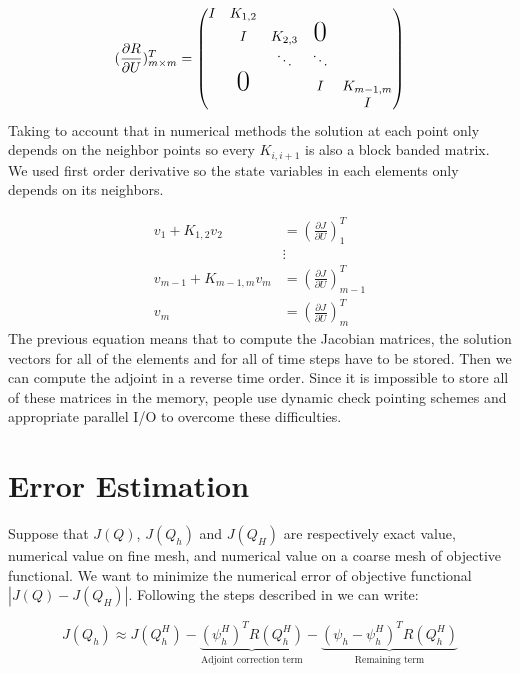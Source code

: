 \documentclass[a4paper,10pt]{article}
\begin{document}
\begin{equation}
   (\frac{\partial R}{\partial U})_{m \times m}^T =
   \begin{pmatrix}
  I & K_{1,2}        &         &               &          \\
    & I              & K_{2,3} & \text{\huge0} &          \\
    &                & \ddots  & \ddots        &          \\
    & \text{\huge0}  &         & I             & K_{m-1,m}\\
    &                &         &               & I
 \end{pmatrix}
  \end{equation}  
Taking to account that in numerical methods the solution at each point only depends on the neighbor points so every $K_{i,i+1}$
is also a block banded matrix. We used first order derivative so the state variables in each elements only depends on its neighbors.

\begin{equation}
  \begin{aligned}
 v_1 + K_{1,2} v_2 &=\left(\frac{\partial J}{\partial U}\right)_1^T \\
 &\vdots\\
 v_{m-1} + K_{m-1,m} v_m &=\left(\frac{\partial J}{\partial U}\right)_{m-1}^T \\
v_m &=\left(\frac{\partial J}{\partial U}\right)_m^T
 \end{aligned}
\end{equation}
The previous equation means that to compute the Jacobian matrices, the solution vectors for all of the elements and for all of time steps 
 have to be stored. Then we can compute the adjoint in a reverse time order.
 Since it is impossible to store all of these matrices in the memory, people use dynamic check pointing schemes 
 and appropriate parallel I/O to overcome these difficulties.
\section{Error Estimation}

Suppose that $ J(Q) $, $ J(Q_h) $ and $ J(Q_H) $ are respectively exact value, numerical value on fine mesh, and numerical value on a coarse mesh of objective functional. We want to minimize the numerical error of objective functional $ |J(Q) - J(Q_H)| $. Following the steps described in \cite{nemec} we can write:

\[
J(Q_h) \approx  J(Q^H_h) - \underbrace{(\psi^H_h)^T R(Q^H_h)}_\text{Adjoint correction term} - 
\underbrace{(\psi_h - \psi^H_h)^T R(Q^H_h)}_\text{Remaining term}
\]
\end{document}
